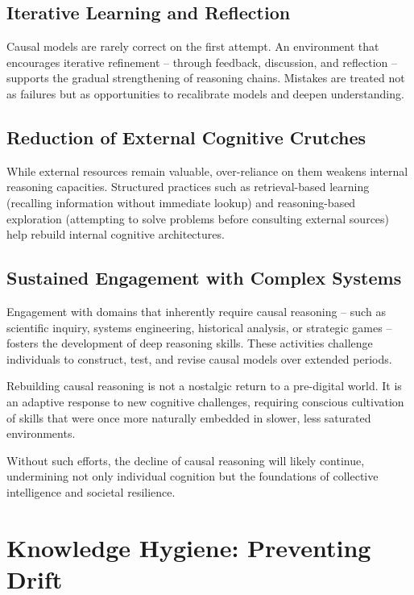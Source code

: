 \subsection{Iterative Learning and Reflection}

Causal models are rarely correct on the first attempt. An environment
that encourages iterative refinement -- through feedback, discussion, and
reflection -- supports the gradual strengthening of reasoning chains.
Mistakes are treated not as failures but as opportunities to recalibrate
models and deepen understanding.

\subsection{Reduction of External Cognitive Crutches}

While external resources remain valuable, over-reliance on them weakens
internal reasoning capacities. Structured practices such as
retrieval-based learning (recalling information without immediate
lookup) and reasoning-based exploration (attempting to solve problems
before consulting external sources) help rebuild internal cognitive
architectures.

\subsection{Sustained Engagement with Complex Systems}

Engagement with domains that inherently require causal reasoning -- such
as scientific inquiry, systems engineering, historical analysis, or
strategic games -- fosters the development of deep reasoning skills.
These activities challenge individuals to construct, test, and revise
causal models over extended periods.

Rebuilding causal reasoning is not a nostalgic return to a pre-digital
world. It is an adaptive response to new cognitive challenges, requiring
conscious cultivation of skills that were once more naturally embedded
in slower, less saturated environments.

Without such efforts, the decline of causal reasoning will likely
continue, undermining not only individual cognition but the foundations
of collective intelligence and societal resilience.



\section{Knowledge Hygiene: Preventing Drift}

